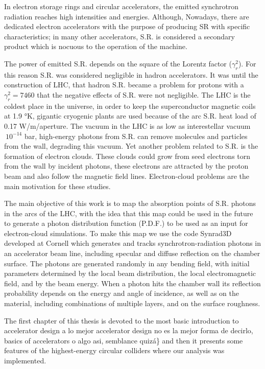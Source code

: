 \documentclass[12pt, letterpaper, twoside, openright]{Thesis} %
\newcommand{\rojo}[1]{{\color{red}{#1}}}
\begin{document}
In electron storage rings and circular accelerators, the emitted synchrotron
radiation reaches high intensities and energies. Although,  Nowadays, there are dedicated
electron accelerators with the purpose of producing SR with specific
characteristics; in many other accelerators, S.R. is considered a secondary
product which is nocuous to the operation of the machine.

The power of emitted S.R. depends on the square of the Lorentz factor
(\(\gamma_r^{2}\)). For this reason S.R. was considered negligible in hadron
accelerators. It was until the construction of LHC, that hadron S.R. became a
problem for protons with a \(\gamma_r^{2}=7460\) that the negative effects of S.R. were not
negligible. The LHC is the coldest place in the universe, in order to keep the
superconductor magnetic coils at 1.9 °K, gigantic cryogenic plants are used
because of the arc S.R. heat load of 0.17 W/m/aperture. The vacuum in the LHC is
as low as interestellar vacuum \(~10^{-14}\) bar, high-energy photons from S.R. can
remove molecules and particles from the wall, degrading this vacuum.  Yet
another problem related to S.R. is the formation of electron clouds. These
clouds could grow from seed electrons torn from the wall by incident photons,
these electrons are attracted by the proton beam and also follow the magnetic
field lines. Electron-cloud problems are the main motivation for these studies.

The main objective of this work is to map the absorption points of S.R. photons in the
arcs of the LHC, with the idea that this map could be used in the future to
generate a photon distribution function (P.D.F.) to be used as an input for
electron-cloud simulations. To make this map we use the code Synrad3D developed
at  Cornell which generates and
tracks synchrotron-radiation photons in an accelerator beam line, including
specular and diffuse reflection on the chamber surface.  The photons are
generated randomly in any bending field, with initial
parameters determined by the local beam distribution, the local electromagnetic
field, and by the beam energy.  When a photon hits the chamber wall its
reflection probability depends on the energy and angle of incidence, as well as
on the material, including combinations of multiple layers, and on the surface
roughness. 

The first chapter of this thesis is devoted to the most basic introduction to
accelerator design \rojo\{a lo mejor accelerator design no es la mejor forma de
decirlo, basics of accelerators o algo asi, semblance quizá\} and then it presents some features
\rojo{a lo mejor en vez de some features, usar the description} of the
highest-energy circular colliders where our analysis was implemented.
\end{document}
